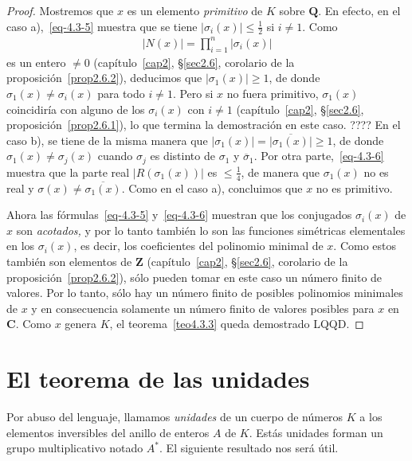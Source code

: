 \documentclass[10pt,oneside,bibtotoc,smallheadings,leqno,a5paper,DIV=12]{scrbook}
\newcommand{\QQ}{\mathbf{Q}}
\newcommand{\ZZ}{\mathbf{Z}}
\newcommand{\CC}{\mathbf{C}}
\newcommand{\QED}{}%
\newcommand{\oline}[1]{\overline{#1}}
\newcommand{\abs}[1]{\left\lvert#1\right\rvert}
\numberwithin{equation}{section}
\theoremstyle{defi}
\theoremstyle{enonce}
\theoremstyle{rem}
\numberwithin{theorem}{section}
\numberwithin{proposition}{section}
\numberwithin{definition}{section}
\numberwithin{lemma}{section}
\numberwithin{corollary}{section}
\numberwithin{example}{section}
\numberwithin{footnote}{section}%
\begin{document}
\begin{proof}
Mostremos que $x$ es un elemento {\em primitivo} de $K$ sobre $\QQ$. En efecto, en el caso a),~\eqref{eq-4.3-5}
muestra que se tiene $\abs{\sigma_{i}(x)}\leq\frac{1}{2}$ si $i\neq 1$. Como
\begin{gather*}
\abs{N(x)} = \prod_{i=1}^{n}\abs{\sigma_{i}(x)}
\end{gather*}
es un entero $\neq 0$ (cap\'itulo~\ref{cap2}, \S\ref{sec2.6}, corolario de la proposici\'on~\ref{prop2.6.2}),
deducimos que $\abs{\sigma_{1}(x)}\geq 1$,
de donde $\sigma_{1}(x)\neq\sigma_{i}(x)$ para todo $i\neq 1$. Pero si $x$ no fuera primitivo,
$\sigma_{1}(x)$ coincidir\'ia con alguno de los $\sigma_{i}(x)$ con $i\neq 1$
(cap\'itulo~\ref{cap2}, \S\ref{sec2.6}, proposici\'on~\ref{prop2.6.1}),
lo que termina la demostraci\'on en este caso. ???? En el caso b), se tiene de la misma manera que
$\abs{\sigma_{1}(x)}=\oline{\abs{\sigma_{1}(x)}}\geq 1$, de donde $\sigma_{1}(x)\neq\sigma_{j}(x)$
cuando $\sigma_{j}$ es distinto de $\sigma_{1}$ y $\oline\sigma_{1}$. Por otra parte,~\eqref{eq-4.3-6}
muestra que la parte real $\abs{R(\sigma_{1}(x))}$ es $\leq\frac{1}{4}$, de manera que $\sigma_{1}(x)$
no es real y $\sigma(x)\neq\oline{\sigma_{1}(x)}$. Como en el caso a), concluimos que $x$ no es primitivo.

Ahora las f\'ormulas~\eqref{eq-4.3-5} y~\eqref{eq-4.3-6} muestran que los conjugados $\sigma_{i}(x)$ de $x$ son
{\em acotados,} y por lo tanto tambi\'en lo son las funciones sim\'etricas elementales en los $\sigma_{i}(x)$,
es decir, los coeficientes del polinomio minimal de $x$. Como estos tambi\'en son elementos de $\ZZ$
(cap\'itulo~\ref{cap2}, \S\ref{sec2.6}, corolario de la proposici\'on~\ref{prop2.6.2}),
s\'olo pueden tomar en este caso un n\'umero finito de valores.
Por lo tanto, s\'olo hay un n\'umero finito de posibles polinomios minimales de $x$ y en consecuencia
solamente un n\'umero finito de valores posibles para $x$ en $\CC$. Como $x$ genera $K$, el teorema~\ref{teo4.3.3} queda
demostrado LQQD.%
\end{proof}

\section{El teorema de las unidades}\label{sec4.4}

Por abuso del lenguaje, llamamos {\em unidades} de un cuerpo de n\'umeros $K$ a los elementos inversibles
del anillo de enteros $A$ de $K$. Est\'as unidades forman un grupo multiplicativo notado $A^{*}$. El
siguiente resultado nos ser\'a \'util.
\end{document}
